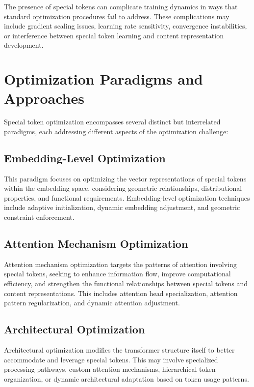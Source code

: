 The presence of special tokens can complicate training dynamics in ways that standard optimization procedures fail to address. These complications may include gradient scaling issues, learning rate sensitivity, convergence instabilities, or interference between special token learning and content representation development.

\section{Optimization Paradigms and Approaches}

Special token optimization encompasses several distinct but interrelated paradigms, each addressing different aspects of the optimization challenge:

\subsection{Embedding-Level Optimization}

This paradigm focuses on optimizing the vector representations of special tokens within the embedding space, considering geometric relationships, distributional properties, and functional requirements. Embedding-level optimization techniques include adaptive initialization, dynamic embedding adjustment, and geometric constraint enforcement.

\subsection{Attention Mechanism Optimization}

Attention mechanism optimization targets the patterns of attention involving special tokens, seeking to enhance information flow, improve computational efficiency, and strengthen the functional relationships between special tokens and content representations. This includes attention head specialization, attention pattern regularization, and dynamic attention adjustment.

\subsection{Architectural Optimization}

Architectural optimization modifies the transformer structure itself to better accommodate and leverage special tokens. This may involve specialized processing pathways, custom attention mechanisms, hierarchical token organization, or dynamic architectural adaptation based on token usage patterns.

